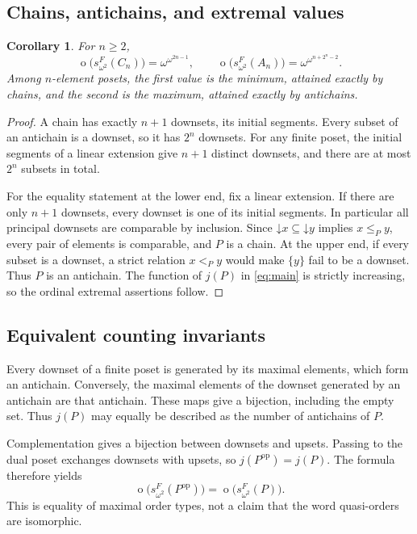 \documentclass[11pt,a4paper]{article}
\numberwithin{equation}{section}
\newtheorem{corollary}[theorem]{Corollary}
\theoremstyle{definition}
\theoremstyle{remark}
\newcommand{\mot}{\mathop{o}}
\newcommand{\down}{\mathord{\downarrow}}
\newcommand{\Wordspace}[1]{s_{\omega^2}^{F}(#1)}
\begin{document}
\subsection{Chains, antichains, and extremal values}

\begin{corollary}\label{cor:extrema}
For $n\ge2$,
\[
 \mot\bigl(\Wordspace {C_n}\bigr)=\omega^{\omega^{2n-1}},
 \qquad
 \mot\bigl(\Wordspace {A_n}\bigr)=\omega^{\omega^{n+2^n-2}}.
\]
Among $n$-element posets, the first value is the minimum, attained exactly
by chains, and the second is the maximum, attained exactly by antichains.
\end{corollary}
\begin{proof}
A chain has exactly $n+1$ downsets, its initial segments. Every subset of
an antichain is a downset, so it has $2^n$ downsets. For any finite poset,
the initial segments of a linear extension give $n+1$ distinct downsets,
and there are at most $2^n$ subsets in total.

For the equality statement at the lower end, fix a linear extension. If
there are only $n+1$ downsets, every downset is one of its initial segments.
In particular all principal downsets are comparable by inclusion. Since
$\down x\subseteq\down y$ implies $x\le_P y$, every pair of elements is
comparable, and $P$ is a chain. At the upper end, if every subset is a
downset, a strict relation $x<_P y$ would make $\{y\}$ fail to be a downset.
Thus $P$ is an antichain. The function of $j(P)$ in \eqref{eq:main} is
strictly increasing, so the ordinal extremal assertions follow.
\end{proof}

\subsection{Equivalent counting invariants}
Every downset of a finite poset is generated by its maximal elements,
which form an antichain. Conversely, the maximal elements of the downset
generated by an antichain are that antichain. These maps give a bijection,
including the empty set. Thus $j(P)$ may equally be described as the number
of antichains of $P$.

Complementation gives a bijection between downsets and upsets. Passing to
the dual poset exchanges downsets with upsets, so $j(P^{\mathrm{op}})=j(P)$.
The formula therefore yields
\[
 \mot\bigl(\Wordspace {P^{\mathrm{op}}}\bigr)
 =\mot\bigl(\Wordspace P\bigr).
\]
This is equality of maximal order types, not a claim that the word
quasi-orders are isomorphic.
\end{document}
